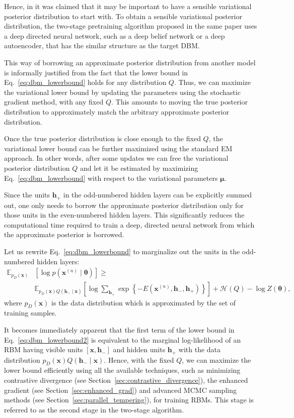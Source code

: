 \documentclass{now}
\newcommand{\vect}[1]{\mathbf{#1}}
\newcommand{\vects}[1]{\boldsymbol{#1}}
\newcommand{\vh}[0]{\vect{h}}
\newcommand{\vx}[0]{\vect{x}}
\newcommand{\vmu}[0]{\vects{\mu}}
\newcommand{\TT}[0]{{\vects{\theta}}}
\newcommand{\HH}[0]{\mathcal{H}}
\newcommand{\E}[0]{\mathbb{E}}
\begin{document}
Hence, in \citep{Cho13ICANN} it was claimed that it may be important to have a
sensible variational posterior distribution to start with. To obtain a sensible
variational posterior distribution, the two-stage pretraining algorithm proposed
in the same paper uses a deep directed neural network, such as a deep belief
network or a deep autoencoder, that has the similar structure as the target DBM.

This way of borrowing an approximate posterior distribution from another model
is informally justified from the fact that the lower bound in
Eq.~\eqref{eq:dbm_lowerbound} holds for any distribution $Q$. Thus, we can
maximize the variational lower bound by updating the parameters using the
stochastic gradient method, with any fixed $Q$. This amounts to moving the true
posterior distribution to approximately match the arbitrary approximate
posterior distribution.

Once the true posterior distribution is close enough to the fixed $Q$, the
variational lower bound can be further maximized using the standard EM approach.
In other words, after some updates we can free the variational posterior
distribution $Q$ and let it be estimated by maximizing
Eq.~\eqref{eq:dbm_lowerbound} with respect to the variational parameters $\vmu$.

Since the units $\vh_+$ in the odd-numbered hidden layers can be explicitly
summed out, one only needs to borrow the approximate posterior distribution only
for those units in the even-numbered hidden layers. This significantly reduces
the computational time required to train a deep, directed neural network from
which the approximate posterior is borrowed.

Let us rewrite Eq.~\eqref{eq:dbm_lowerbound} to marginalize out the units in the
odd-numbered hidden layers:
\begin{align}
    \label{eq:dbm_lowerbound2}
    \E_{p_D(\vx)} &\left[ \log p(\vx^{(n)} \mid \TT) \right]
    \geq 
    \nonumber \\
    &\E_{p_D(\vx)Q(\vh_- \mid \vx)} \left[ \log \sum_{\vh_+} \exp\left\{ -E
    (\vx^{(n)}, \vh_-, \vh_+)\right\} \right] + \HH(Q) - \log Z(\TT),
\end{align}
where $p_D(\vx)$ is the data distribution which is approximated by the set of
training samples.

It becomes immediately apparent that the first term of the lower bound in
Eq.~\eqref{eq:dbm_lowerbound2} is equivalent to the marginal log-likelihood of
an RBM having visible units $\left[ \vx, \vh_- \right]$ and hidden units $\vh_+$
with the data distribution $p_D(\vx) Q(\vh_-\mid\vx)$.  Hence, with the fixed
$Q$, we can maximize the lower bound efficiently using all the available
techniques, such as minimizing contrastive divergence (see
Section~\ref{sec:contrastive_divergence}), the enhanced gradient (see
Section~\ref{sec:enhanced_grad}) and advanced MCMC sampling methods (see
Section~\ref{sec:parallel_tempering}), for training RBMs.  This stage is
referred to as the second stage in the two-stage algorithm.
\end{document}
